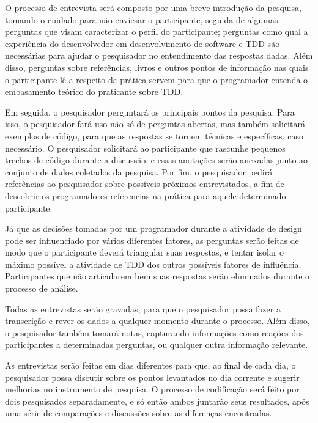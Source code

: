 O processo de entrevista será composto por uma breve introdução da pesquisa, tomando
o cuidado para não enviesar o participante, seguida de algumas perguntas que visam
caracterizar o perfil do participante; perguntas como qual a experiência do
desenvolvedor em desenvolvimento de software e TDD são necessárias para ajudar o
pesquisador no entendimento das respostas dadas. Além disso, perguntas sobre
referências, livros e outros pontos de informação nas quais o participante lê a
respeito da prática servem para que o programador entenda o embasamento teórico
do praticante sobre TDD.

Em seguida, o pesquisador perguntará os principais pontos da pesquisa.
Para isso, o pesquisador fará uso não só de perguntas abertas, mas também
solicitará exemplos de código, para que as respostas se tornem técnicas e
específicas, caso necessário. O pesquisador solicitará ao participante que rascunhe pequenos
trechos de código durante a discussão, e essas anotações serão anexadas junto ao
conjunto de dados coletados da pesquisa.
Por fim, o pesquisador pedirá referências ao pesquisador sobre
possíveis próximos entrevistados, a fim de descobrir os programadores referencias 
na prática para aquele determinado participante.

Já que as decisões tomadas por um programador durante a atividade de design
pode ser influenciado por vários diferentes fatores, 
as perguntas serão feitas de modo que o participante deverá triangular suas respostas,
e tentar isolar o máximo possível a atividade de TDD dos outros possíveis fatores
de influência. Participantes que não articularem bem suas respostas serão eliminados
durante o processo de análise.

Todas as entrevistas serão gravadas, para que o pesquisador possa fazer a
transcrição e rever os dados a qualquer momento durante o processo. Além disso,
o pesquisador também tomará notas, capturando informações como reações dos 
participantes a determinadas perguntas, ou qualquer outra informação relevante. 

As entrevistas serão feitas em dias diferentes para que, ao final
de cada dia, o pesquisador possa discutir sobre os pontos levantados no dia
corrente e sugerir melhorias no instrumento de pesquisa. 
O processo de codificação será feito por dois
pesquisados separadamente, e só então ambos juntarão seus resultados, após uma 
série de comparações e discussões sobre as diferenças encontradas.

